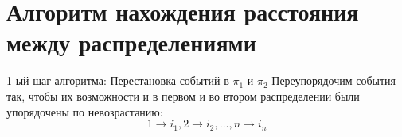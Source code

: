 \documentclass[russian, unicode, mathserif, aspectratio=169]{beamer}
\begin{document}


\section{Алгоритм нахождения расстояния между распределениями}
{
\frame{\transdissolve\sectionpage}
}

\begin{frame}{1-ый шаг алгоритма: Перестановка событий в $\pi_1$ и $\pi_2$}
    Переупорядочим события так, чтобы их возможности и в первом и во втором распределении были упорядочены по невозрастанию:
\begin{equation}
    1\rightarrow i_1, 2 \rightarrow i_2, \ldots, n \rightarrow i_n
\end{equation}
\begin{figure}[h!]
\end{figure}
\end{frame}
\end{document}
